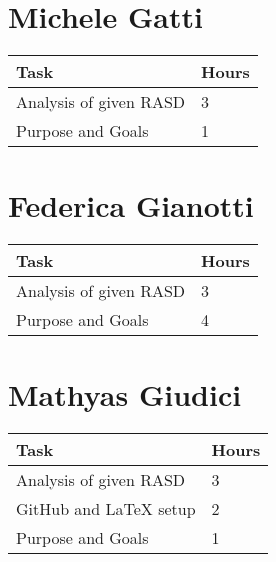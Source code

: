 \section{Michele Gatti}

\:
\begin{center}
\begin{tabular}{ | p{9 cm} | p{3 cm}  |  }
  \hline
    \textbf{Task} & \textbf{Hours }\\ \hline
    Analysis of given RASD & 3 \\ \hline
    Purpose and Goals & 1 \\ \hline
\end{tabular}
\end{center}
\:


\section{Federica Gianotti}

\:
\begin{center}
\begin{tabular}{ | p{9 cm} | p{3 cm}  |  }
  \hline
    \textbf{Task} & \textbf{Hours }\\ \hline
    Analysis of given RASD & 3 \\ \hline
    Purpose and Goals & 4 \\ \hline
\end{tabular}
\end{center}
\:

\section{Mathyas Giudici}

\:
\begin{center}
\begin{tabular}{ | p{9 cm} | p{3 cm}  |  }
  \hline
    \textbf{Task} & \textbf{Hours }\\ \hline
    Analysis of given RASD & 3 \\ \hline
    GitHub and LaTeX setup & 2 \\ \hline
    Purpose and Goals & 1 \\ \hline
\end{tabular}
\end{center}

\clearpage
